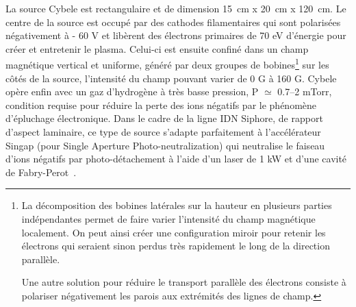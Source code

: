 \begin{refsection}
La source Cybele est rectangulaire et de dimension 
15~cm x 20~cm x 120~cm. Le centre de la source est
occupé par des cathodes filamentaires qui sont polarisées négativement à - 60 V
et libèrent des électrons primaires de 70 eV
d'énergie pour créer et entretenir le plasma.
Celui-ci est ensuite confiné dans un champ magnétique vertical et uniforme, généré par deux
groupes de bobines\footnote{La décomposition des bobines
latérales sur la hauteur en plusieurs parties indépendantes permet de faire
varier l'intensité du champ magnétique localement. On peut ainsi créer une
configuration miroir pour retenir les électrons qui seraient sinon perdus très
rapidement le long de la direction parallèle. 

Une autre solution pour réduire
le transport parallèle des électrons consiste à polariser négativement les
parois aux extrémités des lignes de champ.} sur les côtés de la source,
l'intensité du champ pouvant varier de 0 G à 160 G. Cybele opère enfin avec un
gaz d'hydrogène à très basse pression, P $\simeq$ 0.7--2 mTorr, condition
requise pour réduire la perte des ions négatifs par le phénomène d'épluchage
électronique. Dans le cadre de la
ligne IDN Siphore, de rapport d'aspect laminaire, ce type de
source s'adapte parfaitement à l'accélérateur Singap (pour Single Aperture
Photo-neutralization) qui neutralise le faiseau d'ions négatifs
par photo-détachement à l'aide d'un laser de 1 kW et d'une cavité de
Fabry-Perot~\parencite{SimoninHDR}.


\end{refsection}
